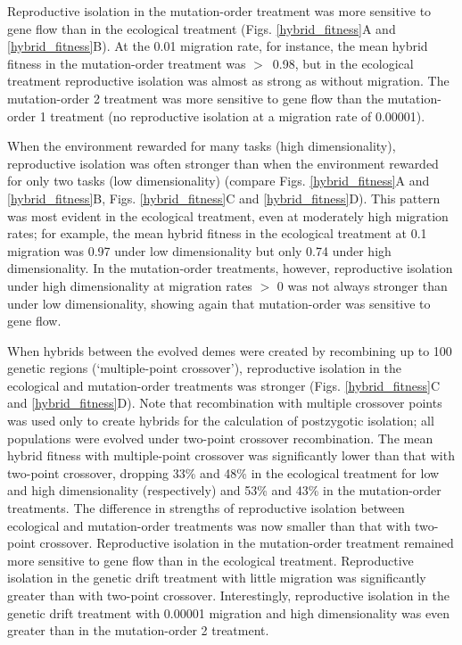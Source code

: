 \begin{doublespace}
Reproductive isolation in the mutation-order treatment
was more sensitive to gene flow than in the ecological treatment
(Figs. \ref{hybrid_fitness}A and \ref{hybrid_fitness}B).
%
At the 0.01 migration rate, for instance,
the mean hybrid fitness in the mutation-order treatment was $>$~0.98,
but in the ecological treatment reproductive isolation
was almost as strong as without migration.
%
The mutation-order 2 treatment was more sensitive to gene flow
than the mutation-order 1 treatment
(no reproductive isolation at a migration rate of 0.00001).



When the environment rewarded for many tasks (high dimensionality),
reproductive isolation was often stronger than
when the environment rewarded for only two tasks (low dimensionality)
(compare Figs. \ref{hybrid_fitness}A and \ref{hybrid_fitness}B,
Figs. \ref{hybrid_fitness}C and \ref{hybrid_fitness}D).
%
This pattern was most evident in the ecological treatment,
even at moderately high migration rates;
for example, the mean hybrid fitness in the ecological treatment
at 0.1 migration was 0.97 under low dimensionality
but only 0.74 under high dimensionality.
%
In the mutation-order treatments, however,
reproductive isolation under high dimensionality at migration rates $>$ 0
was not always stronger than under low dimensionality,
showing again that mutation-order was sensitive to gene flow.



When hybrids between the evolved demes
were created by recombining up to 100 genetic regions
(`multiple-point crossover'),
reproductive isolation in the ecological and mutation-order treatments
was stronger (Figs. \ref{hybrid_fitness}C and \ref{hybrid_fitness}D).
%
Note that recombination with multiple crossover points was used only
to create hybrids for the calculation of postzygotic isolation;
all populations were evolved under two-point crossover recombination.
%
The mean hybrid fitness with multiple-point crossover
was significantly lower than that with two-point crossover,
dropping 33\% and 48\% in the ecological treatment
for low and high dimensionality (respectively)
and 53\% and 43\% in the mutation-order treatments.
%
The difference in strengths of reproductive isolation
between ecological and mutation-order treatments
was now smaller than that with two-point crossover.
%
Reproductive isolation in the mutation-order treatment
remained more sensitive to gene flow than in the ecological treatment.
%
Reproductive isolation in the genetic drift treatment with little migration
was significantly greater than with two-point crossover.
%
Interestingly, reproductive isolation in the genetic drift treatment
with 0.00001 migration and high dimensionality
was even greater than in the mutation-order 2 treatment.




\end{doublespace}
